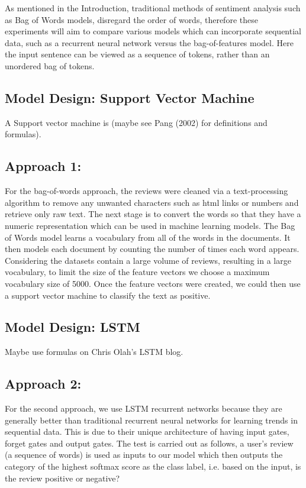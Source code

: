 \documentclass[conference]{IEEEtran}
\begin{document}
As mentioned in the Introduction, traditional methods of sentiment analysis such as Bag of Words models, disregard the order of words, therefore these experiments will aim to compare various models which can incorporate sequential data, such as a recurrent neural network versus the bag-of-features model. Here the input sentence can be viewed as a sequence of tokens, rather than an unordered bag of tokens. 

\subsection{Model Design: Support Vector Machine}

A Support vector machine is (maybe see Pang (2002) for definitions and formulas).

\subsection{Approach 1:} 

For the bag-of-words approach, the reviews were cleaned via a text-processing algorithm to remove any unwanted characters such as html links or numbers and retrieve only raw text. The next stage is to convert the words so that they have a numeric representation which can be used in machine learning models. The Bag of Words model learns a vocabulary from all of the words in the documents. It then models each document by counting the number of times each word appears. Considering the datasets contain a large volume of reviews, resulting in a large vocabulary, to limit the size of the feature vectors we choose a maximum vocabulary size of 5000. Once the feature vectors were created, we could then use a support vector machine to classify the text as positive. 


\subsection{Model Design: LSTM}

Maybe use formulas on Chris Olah's LSTM blog.

\subsection{Approach 2: }

For the second approach, we use LSTM recurrent networks because they are generally better than traditional recurrent neural networks for learning trends in sequential data. This is due to their unique architecture of having input gates, forget gates and output gates. The test is carried out as follows, a user’s review (a sequence of words) is used as inputs to our model which then outputs the category of the highest softmax score as the class label, i.e. based on the input, is the review positive or negative? 
\end{document}
